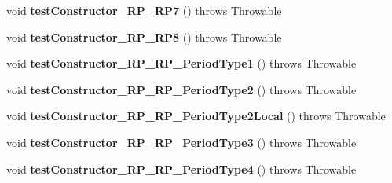 \begin{DoxyCompactItemize}
\item 
\hypertarget{classorg_1_1joda_1_1time_1_1_test_period___constructors_a13216f040720b28850a6d758d8cd3b75}{void {\bfseries test\-Constructor\-\_\-\-R\-P\-\_\-\-R\-P7} ()  throws Throwable }\label{classorg_1_1joda_1_1time_1_1_test_period___constructors_a13216f040720b28850a6d758d8cd3b75}

\item 
\hypertarget{classorg_1_1joda_1_1time_1_1_test_period___constructors_a35c0dc7640ce93de60537b3b7ac05424}{void {\bfseries test\-Constructor\-\_\-\-R\-P\-\_\-\-R\-P8} ()  throws Throwable }\label{classorg_1_1joda_1_1time_1_1_test_period___constructors_a35c0dc7640ce93de60537b3b7ac05424}

\item 
\hypertarget{classorg_1_1joda_1_1time_1_1_test_period___constructors_a9a5892947b929097e70765db545e11d2}{void {\bfseries test\-Constructor\-\_\-\-R\-P\-\_\-\-R\-P\-\_\-\-Period\-Type1} ()  throws Throwable }\label{classorg_1_1joda_1_1time_1_1_test_period___constructors_a9a5892947b929097e70765db545e11d2}

\item 
\hypertarget{classorg_1_1joda_1_1time_1_1_test_period___constructors_a8b0057d1c981b5f5ce18706b6c02c7f2}{void {\bfseries test\-Constructor\-\_\-\-R\-P\-\_\-\-R\-P\-\_\-\-Period\-Type2} ()  throws Throwable }\label{classorg_1_1joda_1_1time_1_1_test_period___constructors_a8b0057d1c981b5f5ce18706b6c02c7f2}

\item 
\hypertarget{classorg_1_1joda_1_1time_1_1_test_period___constructors_af0fd30906938ad419122f8e2797b562e}{void {\bfseries test\-Constructor\-\_\-\-R\-P\-\_\-\-R\-P\-\_\-\-Period\-Type2\-Local} ()  throws Throwable }\label{classorg_1_1joda_1_1time_1_1_test_period___constructors_af0fd30906938ad419122f8e2797b562e}

\item 
\hypertarget{classorg_1_1joda_1_1time_1_1_test_period___constructors_a22369500f2462d1d60ada58290d7c966}{void {\bfseries test\-Constructor\-\_\-\-R\-P\-\_\-\-R\-P\-\_\-\-Period\-Type3} ()  throws Throwable }\label{classorg_1_1joda_1_1time_1_1_test_period___constructors_a22369500f2462d1d60ada58290d7c966}

\item 
\hypertarget{classorg_1_1joda_1_1time_1_1_test_period___constructors_aecdc25956db5f86f2151c851b7427c69}{void {\bfseries test\-Constructor\-\_\-\-R\-P\-\_\-\-R\-P\-\_\-\-Period\-Type4} ()  throws Throwable }\label{classorg_1_1joda_1_1time_1_1_test_period___constructors_aecdc25956db5f86f2151c851b7427c69}


\end{DoxyCompactItemize}
